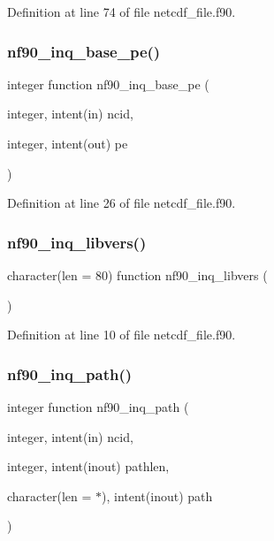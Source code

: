 Definition at line 74 of file netcdf\+\_\+file.\+f90.

\mbox{\label{netcdf__file_8f90_a3312742f3f4f3beeb13f3cda85229298}} 
\subsubsection{\texorpdfstring{nf90\+\_\+inq\+\_\+base\+\_\+pe()}{nf90\_inq\_base\_pe()}}
{\footnotesize\ttfamily integer function nf90\+\_\+inq\+\_\+base\+\_\+pe (\begin{DoxyParamCaption}\item[{integer, intent(in)}]{ncid,  }\item[{integer, intent(out)}]{pe }\end{DoxyParamCaption})}



Definition at line 26 of file netcdf\+\_\+file.\+f90.

\mbox{\label{netcdf__file_8f90_ad94c17f0f0468c40a76d919695e264bf}} 
\subsubsection{\texorpdfstring{nf90\+\_\+inq\+\_\+libvers()}{nf90\_inq\_libvers()}}
{\footnotesize\ttfamily character(len = 80) function nf90\+\_\+inq\+\_\+libvers (\begin{DoxyParamCaption}{ }\end{DoxyParamCaption})}



Definition at line 10 of file netcdf\+\_\+file.\+f90.

\mbox{\label{netcdf__file_8f90_a20c77c8b0e9009b480ea0e8cf314c23f}} 
\subsubsection{\texorpdfstring{nf90\+\_\+inq\+\_\+path()}{nf90\_inq\_path()}}
{\footnotesize\ttfamily integer function nf90\+\_\+inq\+\_\+path (\begin{DoxyParamCaption}\item[{integer, intent(in)}]{ncid,  }\item[{integer, intent(inout)}]{pathlen,  }\item[{character(len = $\ast$), intent(inout)}]{path }\end{DoxyParamCaption})}



